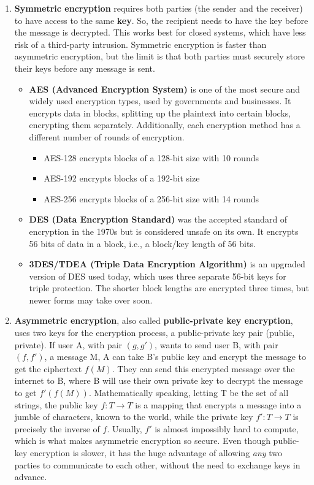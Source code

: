 \documentclass{article}
\begin{document}
    \begin{enumerate}
      \item \textbf{Symmetric encryption} requires both parties (the sender and the receiver) to have access to the same \textbf{key}. So, the recipient needs to have the key before the message is decrypted. This works best for closed systems, which have less risk of a third-party intrusion. Symmetric encryption is faster than asymmetric encryption, but the limit is that both parties must securely store their keys before any message is sent.
      
      \begin{itemize}
        \item \textbf{AES (Advanced Encryption System)} is one of the most secure and widely used encryption types, used by governments and businesses. It encrypts data in blocks, splitting up the plaintext into certain blocks, encrypting them separately. Additionally, each encryption method has a different number of rounds of encryption.
        \begin{itemize}
          \item AES-128 encrypts blocks of a 128-bit size with 10 rounds
          \item AES-192 encrypts blocks of a 192-bit size
          \item AES-256 encrypts blocks of a 256-bit size with 14 rounds
        \end{itemize}
        
        \item \textbf{DES (Data Encryption Standard)} was the accepted standard of encryption in the 1970s but is considered unsafe on its own. It encrypts 56 bits of data in a block, i.e., a block/key length of 56 bits.
        
        \item \textbf{3DES/TDEA (Triple Data Encryption Algorithm)} is an upgraded version of DES used today, which uses three separate 56-bit keys for triple protection. The shorter block lengths are encrypted three times, but newer forms may take over soon.
      \end{itemize}

      \item \textbf{Asymmetric encryption}, also called \textbf{public-private key encryption}, uses two keys for the encryption process, a public-private key pair (public, private). If user A, with pair $(g, g')$, wants to send user B, with pair $(f, f')$, a message M, A can take B's public key and encrypt the message to get the ciphertext $f(M)$. They can send this encrypted message over the internet to B, where B will use their own private key to decrypt the message to get $f'(f(M))$. Mathematically speaking, letting T be the set of all strings, the public key $f: T \rightarrow T$ is a mapping that encrypts a message into a jumble of characters, known to the world, while the private key $f': T \rightarrow T$ is precisely the inverse of $f$. Usually, $f'$ is almost impossibly hard to compute, which is what makes asymmetric encryption so secure. Even though public-key encryption is slower, it has the huge advantage of allowing \textit{any} two parties to communicate to each other, without the need to exchange keys in advance.


\end{enumerate}
\end{document}
